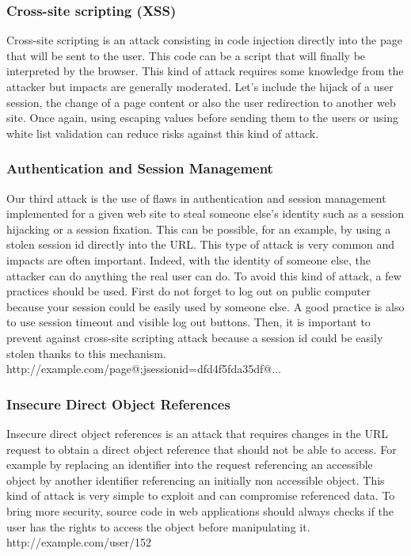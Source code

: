 
\subsubsection{Cross-site scripting (XSS)}
Cross-site scripting is an attack consisting in code injection directly into
the page that will be sent to the user. This code can be a script that will
finally be interpreted by the browser. This kind of attack requires some
knowledge from the attacker but impacts are generally moderated. Let's include
the hijack of a user session, the change of a page content or also the user
redirection to another web site. Once again, using escaping values before
sending them to the users or using white list validation can reduce risks
against this kind of attack.


\subsubsection{Authentication and Session Management}
Our third attack is the use of flaws in authentication and session management
implemented for a given web site to steal someone else's identity such as a
session hijacking or a session fixation. This can be possible, for an example,
by using a stolen session id directly into the URL. This type of attack is
very common and impacts are often important. Indeed, with the identity of
someone else, the attacker can do anything the real user can do. To avoid this
kind of attack, a few practices should be used. First do not forget to log out
on public computer because your session could be easily used by someone else.
A good practice is also to use session timeout and visible log out buttons.
Then, it is important to prevent against cross-site scripting attack because a
session id could be easily stolen thanks to this mechanism.
\\
http://example.com/page@;jsessionid=dfd4f5fda35df@...

\subsubsection{Insecure Direct Object References}
Insecure direct object references is an attack that requires changes in the
URL request to obtain a direct object reference that should not be able to
access. For example by replacing an identifier into the request referencing an
accessible object by another identifier referencing an initially non
accessible object. This kind of attack is very simple to exploit and can
compromise referenced data. To bring more security, source code in web
applications should always checks if the user has the rights to access the
object before manipulating it.
\\
http://example.com/user/152


